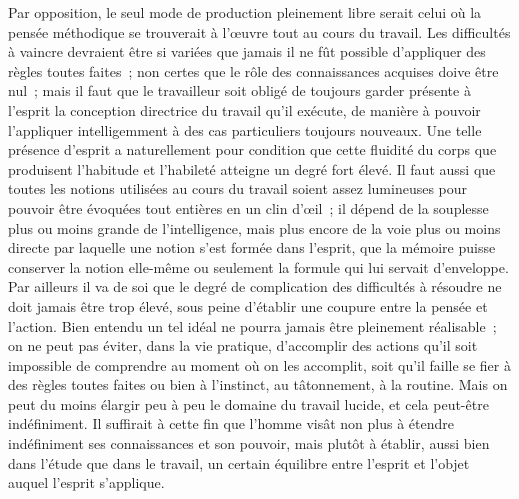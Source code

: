 \documentclass[french,twoside]{book} %
\begin{document}
Par opposition, le seul mode de production pleinement libre serait celui où la pensée méthodique se trouverait à l'œuvre tout au cours du travail. Les difficultés à vaincre devraient être si variées que jamais il ne fût possible d'appliquer des règles toutes faites ; non certes que le rôle des connaissances acquises doive être nul ; mais il faut que le travailleur soit obligé de toujours garder présente à l'esprit la conception directrice du travail qu'il exécute, de manière à pouvoir l'appliquer intelligemment à des cas particuliers toujours nouveaux. Une telle présence d'esprit a naturellement pour condition que cette fluidité du corps que produisent l'habitude et l'habileté atteigne un degré fort élevé. Il faut aussi que toutes les notions utilisées au cours du travail soient assez lumineuses pour pouvoir être évoquées tout entières en un clin d'œil ; il dépend de la souplesse plus ou moins grande de l'intelligence, mais plus encore de la voie plus ou moins directe par laquelle une notion s'est formée dans l'esprit, que la mémoire puisse conserver la notion elle-même ou seulement la formule qui lui servait d'enveloppe. Par ailleurs il va de soi que le degré de complication des difficultés à résoudre ne doit jamais être trop élevé, sous peine d'établir une coupure entre la pensée et l'action. Bien entendu un tel idéal ne pourra jamais être pleinement réalisable ; on ne peut pas éviter, dans la vie pratique, d'accomplir des actions qu'il soit impossible de comprendre au moment où on les accomplit, soit qu'il faille se fier à des règles toutes faites ou bien à l'instinct, au tâtonnement, à la routine. Mais on peut du moins élargir peu à peu le domaine du travail lucide, et cela peut-être indéfiniment. Il suffirait à cette fin que l'homme visât non plus à étendre indéfiniment ses connaissances et son pouvoir, mais plutôt à établir, aussi bien dans l'étude que dans le travail, un certain équilibre entre l'esprit et l'objet auquel l'esprit s'applique.\par
\end{document}
